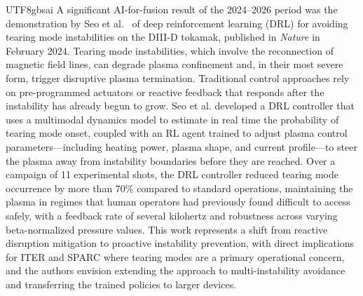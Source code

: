 \documentclass[12pt,a4paper]{article}
\begin{document}
\begin{CJK}{UTF8}{gbsai}
A significant AI-for-fusion result of the 2024--2026 period was the demonstration by Seo et al.~\citep{Seo2024Nature} of deep reinforcement learning (DRL) for avoiding tearing mode instabilities on the DIII-D tokamak, published in \textit{Nature} in February 2024. Tearing mode instabilities, which involve the reconnection of magnetic field lines, can degrade plasma confinement and, in their most severe form, trigger disruptive plasma termination. Traditional control approaches rely on pre-programmed actuators or reactive feedback that responds after the instability has already begun to grow. Seo et al. developed a DRL controller that uses a multimodal dynamics model to estimate in real time the probability of tearing mode onset, coupled with an RL agent trained to adjust plasma control parameters---including heating power, plasma shape, and current profile---to steer the plasma away from instability boundaries before they are reached. Over a campaign of 11 experimental shots, the DRL controller reduced tearing mode occurrence by more than 70\% compared to standard operations, maintaining the plasma in regimes that human operators had previously found difficult to access safely, with a feedback rate of several kilohertz and robustness across varying beta-normalized pressure values. This work represents a shift from reactive disruption mitigation to proactive instability prevention, with direct implications for ITER and SPARC where tearing modes are a primary operational concern, and the authors envision extending the approach to multi-instability avoidance and transferring the trained policies to larger devices.


\end{CJK}
\end{document}

